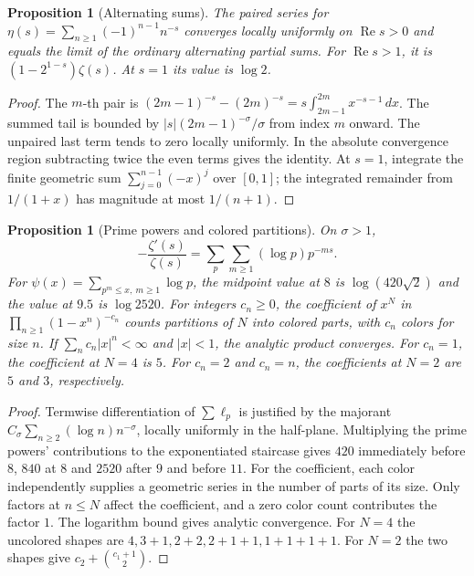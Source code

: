 \documentclass[11pt,reqno]{amsart}
\newtheorem{proposition}[theorem]{Proposition}
\theoremstyle{definition}
\theoremstyle{remark}
\numberwithin{equation}{section}
\begin{document}
\begin{proposition}[Alternating sums]\label{m9:eta}
The paired series for \(\eta(s)=\sum_{n\ge1}(-1)^{n-1}n^{-s}\)
converges locally uniformly on \(\operatorname{Re}s>0\) and
equals the limit of the ordinary alternating partial sums.
For \(\operatorname{Re}s>1\), it is
\((1-2^{1-s})\zeta(s)\). At \(s=1\) its value is \(\log2\).
\end{proposition}
\begin{proof}
The \(m\)-th pair is
\((2m-1)^{-s}-(2m)^{-s}=s\int_{2m-1}^{2m}x^{-s-1}\,dx\).
The summed tail is bounded by \(|s|(2m-1)^{-\sigma}/\sigma\)
from index \(m\) onward. The unpaired last term tends to zero
locally uniformly. In the absolute convergence region
subtracting twice the even terms gives the identity.
At \(s=1\), integrate the finite geometric sum
\(\sum_{j=0}^{n-1}(-x)^j\) over \([0,1]\); the integrated
remainder from \(1/(1+x)\) has magnitude at most \(1/(n+1)\).
\end{proof}

\begin{proposition}[Prime powers and colored partitions]\label{m9:partitions}
On \(\sigma>1\),
\[
 -\frac{\zeta'(s)}{\zeta(s)}=
  \sum_p\sum_{m\ge1}(\log p)p^{-ms}.
\]
For \(\psi(x)=\sum_{p^m\le x,\ m\ge1}\log p\), the midpoint
value at \(8\) is \(\log(420\sqrt2)\) and the value at \(9.5\)
is \(\log2520\).
For integers \(c_n\ge0\), the coefficient of \(x^N\) in
\(\prod_{n\ge1}(1-x^n)^{-c_n}\) counts partitions of \(N\)
into colored parts, with \(c_n\) colors for size \(n\).
If \(\sum_n c_n |x|^n<\infty\) and \(|x|<1\), the analytic
product converges. For \(c_n=1\), the coefficient at \(N=4\)
is \(5\). For \(c_n=2\) and \(c_n=n\), the coefficients at
\(N=2\) are \(5\) and \(3\), respectively.
\end{proposition}
\begin{proof}
Termwise differentiation of \(\sum\ell_p\) is justified by the
majorant \(C_\sigma\sum_{n\ge2}(\log n)n^{-\sigma}\), locally
uniformly in the half-plane. Multiplying the prime powers'
contributions to the exponentiated staircase gives \(420\)
immediately before \(8\), \(840\) at \(8\) and \(2520\)
after \(9\) and before \(11\). For the coefficient, each color
independently supplies a geometric series in the number of
parts of its size. Only factors at \(n\le N\) affect the
coefficient, and a zero color count contributes the factor \(1\).
The logarithm bound gives analytic convergence. For \(N=4\)
the uncolored shapes are \(4,3+1,2+2,2+1+1,1+1+1+1\).
For \(N=2\) the two shapes give \(c_2+\binom{c_1+1}{2}\).
\end{proof}
\end{document}
